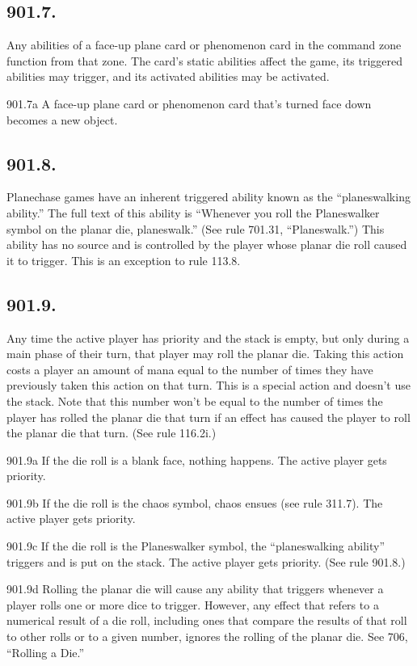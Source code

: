 \subsection*{901.7.}
Any abilities of a face-up plane card or phenomenon card in the command zone function from that zone. The card’s static abilities affect the game, its triggered abilities may trigger, and its activated abilities may be activated.

901.7a A face-up plane card or phenomenon card that’s turned face down becomes a new object.

\subsection*{901.8.}
Planechase games have an inherent triggered ability known as the “planeswalking ability.” The full text of this ability is “Whenever you roll the Planeswalker symbol on the planar die, planeswalk.” (See rule 701.31, “Planeswalk.”) This ability has no source and is controlled by the player whose planar die roll caused it to trigger. This is an exception to rule 113.8.

\subsection*{901.9.}
Any time the active player has priority and the stack is empty, but only during a main phase of their turn, that player may roll the planar die. Taking this action costs a player an amount of mana equal to the number of times they have previously taken this action on that turn. This is a special action and doesn’t use the stack. Note that this number won’t be equal to the number of times the player has rolled the planar die that turn if an effect has caused the player to roll the planar die that turn. (See rule 116.2i.)

901.9a If the die roll is a blank face, nothing happens. The active player gets priority.

901.9b If the die roll is the chaos symbol, chaos ensues (see rule 311.7). The active player gets priority.

901.9c If the die roll is the Planeswalker symbol, the “planeswalking ability” triggers and is put on the stack. The active player gets priority. (See rule 901.8.)

901.9d Rolling the planar die will cause any ability that triggers whenever a player rolls one or more dice to trigger. However, any effect that refers to a numerical result of a die roll, including ones that compare the results of that roll to other rolls or to a given number, ignores the rolling of the planar die. See 706, “Rolling a Die.”

